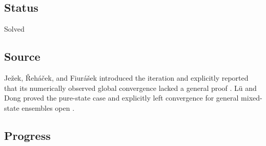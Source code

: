 \subsection*{Status}

Solved

\subsection*{Source}

Je\v{z}ek, \v{R}eh\'{a}\v{c}ek, and Fiur\'{a}\v{s}ek introduced the
iteration and explicitly reported that its numerically observed global
convergence lacked a general proof
.  L\"u and Dong proved
the pure-state case and explicitly left convergence for general mixed-state
ensembles open .

\subsection*{Progress}


